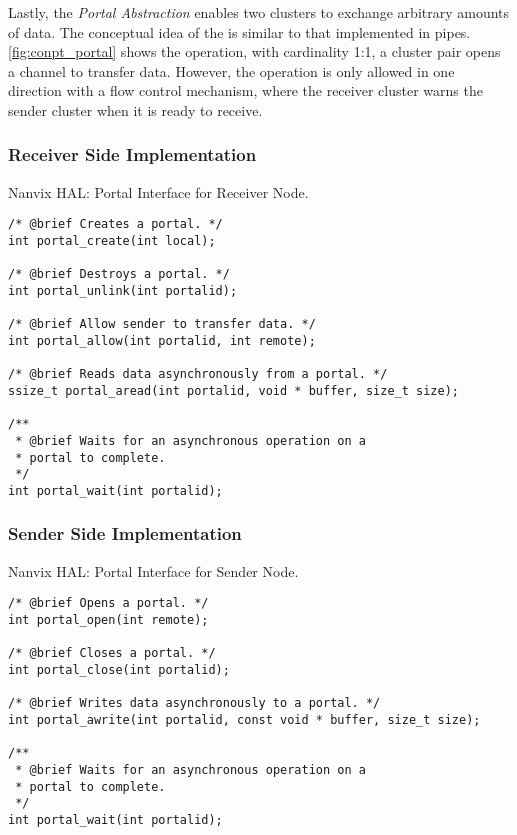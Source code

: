 
			Lastly, the \textit{Portal Abstraction} enables two clusters to exchange arbitrary
			amounts of data.
			The conceptual idea of the \portal is similar to that implemented in \posix pipes.
			\autoref{fig:conpt_portal} shows the \portal operation, with cardinality
			1:1, a cluster pair opens a channel to transfer data.
			However, the operation is only allowed in one direction with a flow control mechanism,
			where the receiver cluster warns the sender cluster when it is ready to receive.

			\subsubsection{Receiver Side Implementation}

\begin{listing}[!tb]
\caption{Nanvix HAL: Portal Interface for Receiver Node.}
\label{code:hal-portal-receiver}
\begin{verbatim}
/* @brief Creates a portal. */
int portal_create(int local);

/* @brief Destroys a portal. */
int portal_unlink(int portalid);

/* @brief Allow sender to transfer data. */
int portal_allow(int portalid, int remote);

/* @brief Reads data asynchronously from a portal. */
ssize_t portal_aread(int portalid, void * buffer, size_t size);

/**
 * @brief Waits for an asynchronous operation on a
 * portal to complete.
 */
int portal_wait(int portalid);
\end{verbatim}
\end{listing}

			\subsubsection{Sender Side Implementation}

\begin{listing}[!tb]
\caption{Nanvix HAL: Portal Interface for Sender Node.}
\label{code:hal-portal-sender}
\begin{verbatim}
/* @brief Opens a portal. */
int portal_open(int remote);

/* @brief Closes a portal. */
int portal_close(int portalid);

/* @brief Writes data asynchronously to a portal. */
int portal_awrite(int portalid, const void * buffer, size_t size);

/**
 * @brief Waits for an asynchronous operation on a
 * portal to complete.
 */
int portal_wait(int portalid);
\end{verbatim}
\end{listing}


